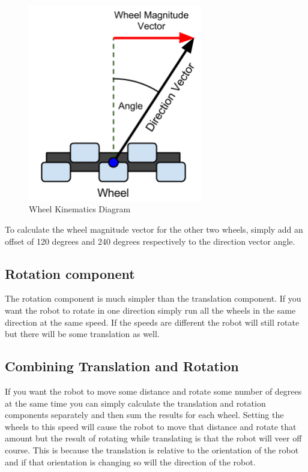 \begin{figure}[H]
    \begin{center}
        \includegraphics[width=3in]{images/motion_control.png}
    \end{center}
    \caption{Wheel Kinematics Diagram}
    \label{figure:kinematics}
\end{figure}

To calculate the wheel magnitude vector for the other two wheels, simply add an offset of 120 degrees and 240 degrees respectively to the direction vector angle.

\subsection{Rotation component}

The rotation component is much simpler than the translation component. If you want the robot to rotate in one direction simply run all the wheels in the same direction at the same speed. If the speeds are different the robot will still rotate but there will be some translation as well.

\subsection{Combining Translation and Rotation}

If you want the robot to move some distance and rotate some number of degrees at the same time you can simply calculate the translation and rotation components separately and then sum the results for each wheel. Setting the wheels to this speed will cause the robot to move that distance and rotate that amount but the result of rotating while translating is that the robot will veer off course. This is because the translation is relative to the orientation of the robot and if that orientation is changing so will the direction of the robot.


